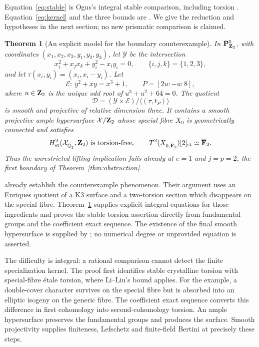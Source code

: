 \documentclass[11pt]{article}
\newcommand{\FF}{\mathbf F}\newcommand{\PP}{\mathbf P}
\newcommand{\et}{\mathrm{et}}\newcommand{\crys}{\mathrm{crys}}
\newcommand{\st}{\mathrm{st}}\newcommand{\tors}{\mathrm{tors}}
\newtheorem{theorem}{Theorem}[section]
\theoremstyle{definition}\newtheorem{definition}[theorem]{Definition}
\theoremstyle{remark}\newtheorem{remark}[theorem]{Remark}
\begin{document}
Equation~\eqref{eq:stable} is Ogus's integral stable comparison, including torsion \citep[Theorem~4.9, Remark~4.10, Corollary~4.11, pp.~314--315]{Ogus}. Equation~\eqref{eq:kernel} and the three bounds are \citet[Theorem~4.14 and Corollary~4.15, author-version pp.~27--28]{LiLiu}. We give the reduction and hypotheses in the next section; no new prismatic comparison is claimed.

\begin{theorem}[An explicit model for the boundary counterexample]\label{thm:surface}
In $\PP^5_{\ZZ_2}$, with coordinates $(x_1,x_2,x_3,y_1,y_2,y_3)$, let $\mathcal Y$ be the intersection
\begin{equation}\label{eq:quadrics}
 x_i^2+x_jx_k+y_i^2-x_iy_i=0,
 \qquad \{i,j,k\}=\{1,2,3\},
\end{equation}
and let $\tau(x_i,y_i)=(x_i,x_i-y_i)$. Let
\[
 \mathcal E:\ y^2+xy=x^3+1,
 \qquad P=[2u:-u:8],
\]
where $u\in\mathbf Z_2$ is the unique odd root of $u^3+u^2+64=0$. The quotient
\[
 \mathcal D=(\mathcal Y\times\mathcal E)/
                     \langle(\tau,t_P)\rangle
\]
is smooth and projective of relative dimension three. It contains a smooth projective ample hypersurface $\mathcal X/\mathbf Z_2$ whose special fibre $X_0$ is geometrically connected and satisfies
\[
 H^2_{\et}(\mathcal X_{\overline{\mathbb Q}_2},\ZZ_2)
       \text{ is torsion-free},
 \qquad
 T^2(X_{0,\overline{\FF}_2})[2]_{\st}
       \simeq\overline{\FF}_2.
\]
Thus the unrestricted lifting implication fails already at $e=1$ and $j=p=2$, the first boundary of Theorem~\ref{thm:obstruction}.
\end{theorem}

\citet[Theorem~2.1 and Proposition~2.2, pp.~236--238]{BMS} already establish the counterexample phenomenon. Their argument uses an Enriques quotient of a K3 surface and a two-torsion section which disappears on the special fibre. Theorem~\ref{thm:surface} supplies explicit integral equations for those ingredients and proves the stable torsion assertion directly from fundamental groups and the coefficient exact sequence. The existence of the final smooth hypersurface is supplied by \citet[Theorem~1.1]{Poonen}; no numerical degree or unprovided equation is asserted.

The difficulty is integral: a rational comparison cannot detect the finite specialization kernel. The proof first identifies stable crystalline torsion with special-fibre \'etale torsion, where Li--Liu's bound applies. For the example, a double-cover character survives on the special fibre but is absorbed into an elliptic isogeny on the generic fibre. The coefficient exact sequence converts this difference in first cohomology into second-cohomology torsion. An ample hypersurface preserves the fundamental groups and produces the surface. Smooth projectivity supplies finiteness, Lefschetz and finite-field Bertini at precisely these steps.
\end{document}
